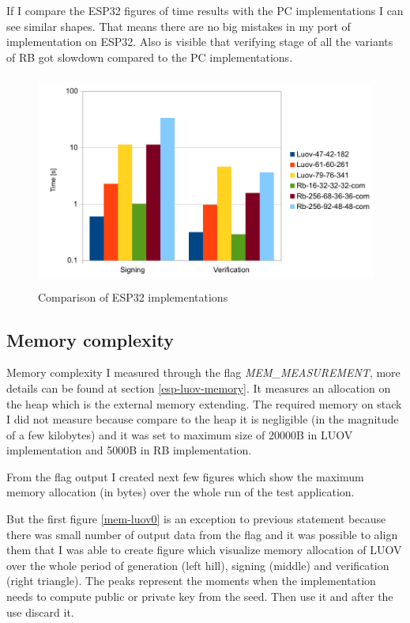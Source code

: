 \documentclass[thesis=M,english]{FITthesis}[2019/12/23]
\begin{document}
\bigskip
\noindent
If I compare the ESP32 figures of time results with the PC implementations I can see similar shapes. That means there are no big mistakes in my port of implementation on ESP32. Also is visible that verifying stage of all the variants of RB got slowdown compared to the PC implementations.

\begin{figure}[H]
\centering
\includegraphics[width=13cm,height=7cm]{images/time-both.pdf}
\caption{Comparison of ESP32 implementations}
\label{time-both}
\end{figure}

\subsection{Memory complexity}
Memory complexity I measured through the flag \textit{MEM\_MEASUREMENT}, more details can be found at section \ref{esp-luov-memory}. It measures an allocation on the heap which is the external memory extending. The required memory on stack I did not measure because compare to the heap it is negligible (in the magnitude of a few kilobytes) and it was set to maximum size of 20000B in LUOV implementation and 5000B in RB implementation.

\bigskip
\noindent
From the flag output I created next few figures which show the maximum memory allocation (in bytes) over the whole run of the test application.

\bigskip
\noindent
But the first figure \ref{mem-luov0} is an exception to previous statement because there was small number of output data from the flag and it was possible to align them that I was able to create figure which visualize memory allocation of LUOV over the whole period of generation (left hill), signing (middle) and verification (right triangle). The peaks represent the moments when the implementation needs to compute public or private key from the seed. Then use it and after the use discard it.
\end{document}
